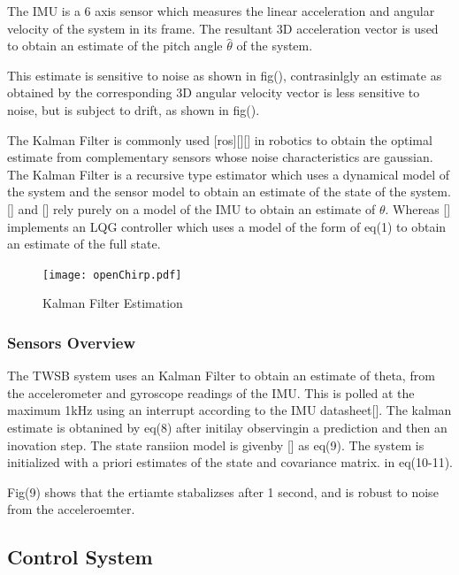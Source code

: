         The IMU is a 6 axis sensor which measures the linear acceleration and angular velocity of the system in its frame. 
        The resultant 3D acceleration vector is used to obtain an estimate of the pitch angle $\hat\theta$ of the system.

        This estimate is sensitive to noise as shown in fig(), contrasinlgly an estimate as obtained by the 
        corresponding 3D angular velocity vector is less sensitive to noise, but is subject to drift, as shown in fig().

        The Kalman Filter is commonly used [ros][][] in robotics to obtain the optimal estimate from complementary sensors whose 
        noise characteristics are gaussian. The Kalman Filter is a recursive type estimator which uses a dynamical model of the system 
        and the sensor model to obtain an estimate of the state of the system. [] and [] rely purely on a model of the IMU 
        to obtain an estimate of $\theta$. 
        Whereas [] implements an LQG controller which uses a model of the form of eq(1) to obtain an estimate of the full state.

        

        \begin{figure}
            \centering
            \texttt{[image: openChirp.pdf]}
            \caption{Kalman Filter Estimation}
        \end{figure}

        \subsubsection{Sensors Overview}
        The TWSB system uses an Kalman Filter to obtain an estimate of theta, 
        from the accelerometer and gyroscope readings of the IMU. 
        This is polled at the maximum 1kHz using an interrupt according to the IMU datasheet[]. 
        The kalman estimate is obtanined by eq(8)  after initilay observingin
         a prediction and then an inovation step.
        The state ransiion model is givenby [] as eq(9).  The system is initialized with a 
        priori estimates of the state and covariance matrix. in eq(10-11). 

        Fig(9) shows that the ertiamte stabalizses after 1 second, 
        and is robust to noise from the acceleroemter. 
        \pagebreak{}
    \subsection{Control System}
       
